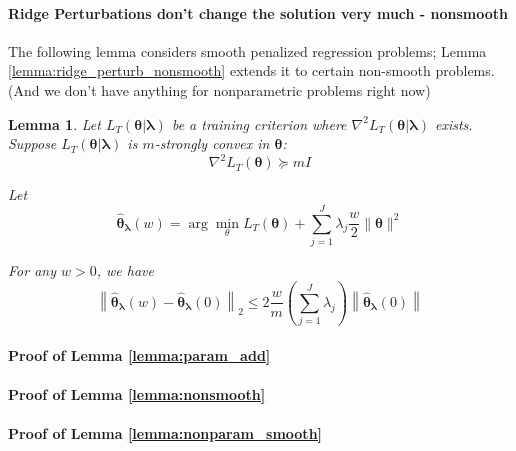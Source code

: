 \documentclass[12pt]{article}
\newtheorem{lemma}{Lemma}
\begin{document}
\paragraph{Ridge Perturbations don't change the solution very much - nonsmooth}
The following lemma considers smooth penalized regression problems; Lemma \ref{lemma:ridge_perturb_nonsmooth} extends it to certain non-smooth problems. (And we don't have anything for nonparametric problems right now)
\begin{lemma}
	\label{lemma:ridge_perturb_smooth}
	Let $L_{T}(\boldsymbol{\theta}|\boldsymbol{\lambda})$ be a training criterion where $\nabla^{2}L_{T}(\boldsymbol{\theta}|\boldsymbol{\lambda})$
	exists. Suppose $L_{T}(\boldsymbol{\theta}|\boldsymbol{\lambda})$ is $m$-strongly convex in $\boldsymbol{\theta}$:
	$$
	\nabla^{2}L_{T}(\boldsymbol{\theta})\succeq mI
	$$
	
	Let
	\begin{equation}
	\hat{\boldsymbol{\theta}}_{\boldsymbol{\lambda}}(w)=\arg\min_{\theta}L_{T}(\boldsymbol{\theta})+\sum_{j=1}^{J}\lambda_{j}\frac{w}{2}\|\boldsymbol{\theta}\|^{2}
	\end{equation}
	
	For any $w>0$, we have
	\begin{equation}
	\left \|
	\hat{\boldsymbol{\theta}}_{\boldsymbol{\lambda}}(w)-\hat{\boldsymbol{\theta}}_{\boldsymbol{\lambda}}(0)
	\right \|_{2}	
	\le	
	2 \frac{w}{m} \left(\sum_{j=1}^{J}\lambda_{j}\right)
	\left \|\hat{\boldsymbol{\theta}}_{\boldsymbol{\lambda}}(0) \right \|
	\end{equation} 
	
\end{lemma}

\paragraph{Proof of Lemma \ref{lemma:param_add}}

\paragraph{Proof of Lemma \ref{lemma:nonsmooth}}

\paragraph{Proof of Lemma \ref{lemma:nonparam_smooth}}


\bigskip



\end{document}
